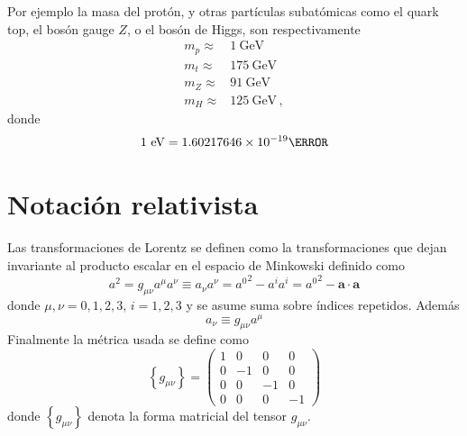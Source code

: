 \begin{frame}
Por ejemplo la masa del protón, y otras partículas subatómicas como el quark top, el bosón gauge $Z$, o el bosón de Higgs, son respectivamente
\begin{align*}
  m_p\approx &1\ \text{GeV}\\
  m_t\approx& 175\ \text{GeV}\\
  m_Z\approx& 91\ \text{GeV}\\
  m_H\approx& 125\ \text{GeV}\,,
\end{align*}
donde
\begin{align*}
  1\ \text{eV}=\SI{1.60217646\times 10^{-19}}{\joule}
\end{align*}

\end{frame}
\section{Notación relativista}
\label{sec:srn}
Las transformaciones de Lorentz se definen como la transformaciones que dejan invariante al producto escalar en el espacio de Minkowski definido como
\begin{equation}
  \label{eq:146qft}
  a^2=g_{\mu\nu}a^\mu a^\nu\equiv a_\nu a^\nu={a^0}^2-a^i a^i={a^0}^2-\mathbf{a}\cdot\mathbf{a}
\end{equation}
donde $\mu,\nu=0,1,2,3$, $i=1,2,3$ y se asume suma sobre índices repetidos. Además
\begin{equation}
\label{eq:149qft}
  a_\nu\equiv g_{\mu\nu}a^\mu
\end{equation}
 Finalmente la métrica usada se define como
\begin{equation}
  \label{eq:gmunu}
  \left\{ g_{\mu\nu} \right\}=
  \begin{pmatrix}
    1&0&0&0\\
    0&-1&0&0\\
    0&0&-1&0\\
    0&0&0&-1
  \end{pmatrix}
\end{equation}
donde $\left\{ g_{\mu\nu} \right\}$ denota la forma matricial del tensor $g_{\mu\nu}$.  

